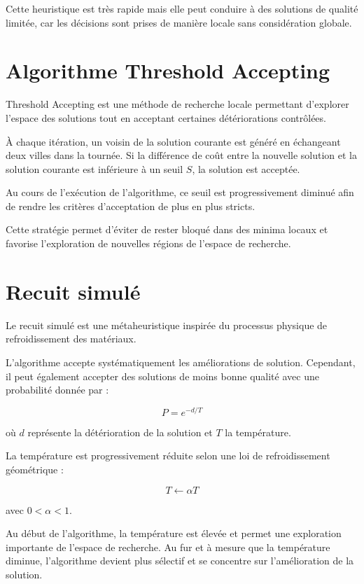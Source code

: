 \documentclass[11pt,a4paper]{article}
\begin{document}
	Cette heuristique est très rapide mais elle peut conduire à des solutions de qualité limitée, car les décisions sont prises de manière locale sans considération globale.
	\section{Algorithme Threshold Accepting}
	
	Threshold Accepting est une méthode de recherche locale permettant d'explorer l'espace des solutions tout en acceptant certaines détériorations contrôlées.
	
	À chaque itération, un voisin de la solution courante est généré en échangeant deux villes dans la tournée.
	Si la différence de coût entre la nouvelle solution et la solution courante est inférieure à un seuil $S$, la solution est acceptée.
	
	Au cours de l'exécution de l'algorithme, ce seuil est progressivement diminué afin de rendre les critères d'acceptation de plus en plus stricts.
	
	Cette stratégie permet d'éviter de rester bloqué dans des minima locaux et favorise l'exploration de nouvelles régions de l'espace de recherche.
	
	\section{Recuit simulé}
	
	Le recuit simulé est une métaheuristique inspirée du processus physique de refroidissement des matériaux.
	
	L'algorithme accepte systématiquement les améliorations de solution.
	Cependant, il peut également accepter des solutions de moins bonne qualité avec une probabilité donnée par :
	
	\[
	P = e^{-d/T}
	\]
	
	où $d$ représente la détérioration de la solution et $T$ la température.
	
	La température est progressivement réduite selon une loi de refroidissement géométrique :
	
	\[
	T \leftarrow \alpha T
	\]
	
	avec $0<\alpha<1$.
	
	Au début de l'algorithme, la température est élevée et permet une exploration importante de l'espace de recherche.
	Au fur et à mesure que la température diminue, l'algorithme devient plus sélectif et se concentre sur l'amélioration de la solution.
	
\end{document}
